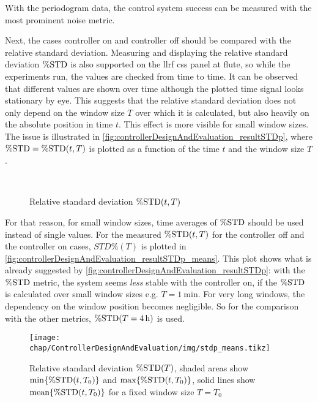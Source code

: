 With the periodogram data, the control system success can be measured with the most prominent noise metric.

Next, the cases controller on and controller off should be compared with the relative standard deviation. Measuring and displaying the relative standard deviation $\operatorname{\%STD}$ is also supported on the \gls{llrf} \gls{css} panel at \gls{flute}, so while the experiments run, the values are checked from time to time. It can be observed that different values are shown over time although the plotted time signal looks stationary by eye. This suggests that the relative standard deviation does not only depend on the window size $T$ over which it is calculated, but also heavily on the absolute position in time $t$. This effect is more visible for small window sizes. The issue is illustrated in \autoref{fig:controllerDesignAndEvaluation_resultSTDp}, where $\operatorname{\%STD}=\operatorname{\%STD}(t,T)$ is plotted as a function of the time $t$ and the window size $T$.

\begin{figure}[tb]
    \centering
        \\
       \caption{Relative standard deviation $\operatorname{\%STD}(t,T)$}
    \label{fig:controllerDesignAndEvaluation_resultSTDp}
\end{figure}

For that reason, for small window sizes, time averages of $\operatorname{\%STD}$ should be used instead of single values. For the measured $\operatorname{\%STD}(t,T)$ for the controller off and the controller on cases, $STD\%(T)$ is plotted in \autoref{fig:controllerDesignAndEvaluation_resultSTDp_means}. This plot shows what is already suggested by \autoref{fig:controllerDesignAndEvaluation_resultSTDp}: with the $\operatorname{\%STD}$ metric, the system seems \textit{less} stable with the controller on, if the $\operatorname{\%STD}$ is calculated over small window sizes e.g. $T=\SI{1}{\minute}$. For very long windows, the dependency on the window position becomes negligible. So for the comparison with the other metrics, $\operatorname{\%STD}(T=\SI{4}{\hour})$ is used. 

\begin{figure}[tb]
	\centering
	\texttt{[image: chap/ControllerDesignAndEvaluation/img/stdp\_means.tikz]}
	\caption[Relative standard deviation $\op{\%STD}(T)$]{Relative standard deviation $\op{\%STD}(T)$, shaded areas show $\operatorname{min}\{\operatorname{\%STD}(t,T_0)\}$ and $\operatorname{max}\{\operatorname{\%STD}(t,T_0)\}$, solid lines show $\operatorname{mean}\{\operatorname{\%STD}(t,T_0)\}$ for a fixed window size $T=T_0$}
	\label{fig:controllerDesignAndEvaluation_resultSTDp_means}
\end{figure}


